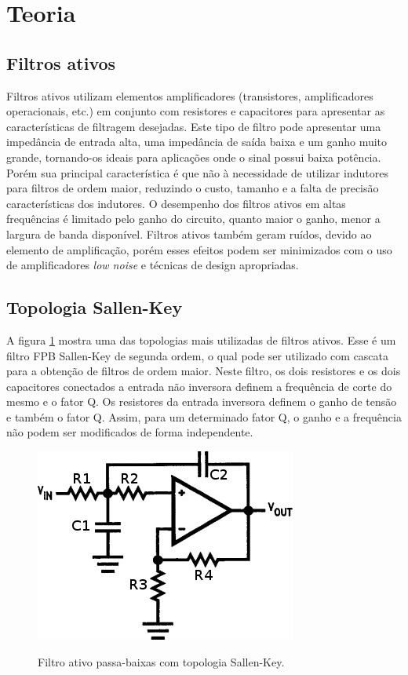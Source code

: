 \newpage
\section{Teoria}
\subsection{Filtros ativos}
Filtros ativos utilizam elementos amplificadores (transistores, amplificadores operacionais, etc.) em conjunto com resistores e capacitores para apresentar as características de filtragem desejadas.
Este tipo de filtro pode apresentar uma impedância de entrada alta, uma impedância de saída baixa e um ganho muito grande, tornando-os ideais para aplicações onde o sinal possui baixa potência. Porém sua principal característica é que não à necessidade de utilizar indutores para filtros de ordem maior, reduzindo o custo, tamanho e a falta de precisão características dos indutores.
O desempenho dos filtros ativos em altas frequências é limitado pelo ganho do circuito, quanto maior o ganho, menor a largura de banda disponível.
Filtros ativos também geram ruídos, devido ao elemento de amplificação, porém esses efeitos podem ser minimizados com o uso de amplificadores 	\textit{low noise} e técnicas de design apropriadas.

\subsection{Topologia Sallen-Key}
A figura \ref{f_skey} mostra uma das topologias mais utilizadas de filtros ativos. Esse é um filtro FPB Sallen-Key de segunda ordem, o qual pode ser utilizado com cascata para a obtenção de filtros de ordem maior.
Neste filtro, os dois resistores e os dois capacitores conectados a entrada não inversora definem a frequência de corte do mesmo e o fator Q. Os resistores da entrada inversora definem o ganho de tensão e também o fator Q. Assim, para um determinado fator Q, o ganho e a frequência não podem ser modificados de forma independente.

\begin{figure}[H]
\centering
\includegraphics[scale=0.5]{Imagens/skey.jpg}
\label{f_skey}
\caption{Filtro ativo passa-baixas com topologia Sallen-Key.}
\end{figure}


